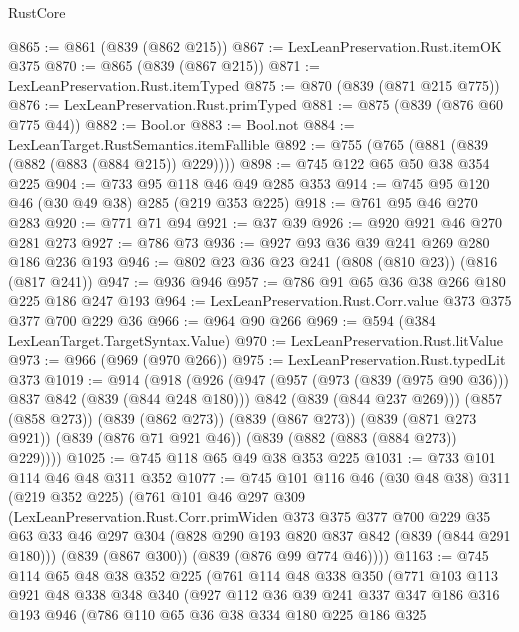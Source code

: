 \begin{lexlean}{RustCore}
\begin{coremodule}
@865 := @861 (@839 (@862 @215))
@867 := LexLeanPreservation.Rust.itemOK @375
@870 := @865 (@839 (@867 @215))
@871 := LexLeanPreservation.Rust.itemTyped
@875 := @870 (@839 (@871 @215 @775))
@876 := LexLeanPreservation.Rust.primTyped
@881 := @875 (@839 (@876 @60 @775 @44))
@882 := Bool.or
@883 := Bool.not
@884 := LexLeanTarget.RustSemantics.itemFallible
@892 := @755 (@765 (@881 (@839 (@882 (@883 (@884 @215)) @229))))
@898 := @745 @122 @65 @50 @38 @354 @225
@904 := @733 @95 @118 @46 @49 @285 @353
@914 := @745 @95 @120 @46 (@30 @49 @38) @285 (@219 @353 @225)
@918 := @761 @95 @46 @270 @283
@920 := @771 @71 @94
@921 := @37 @39
@926 := @920 @921 @46 @270 @281 @273
@927 := @786 @73
@936 := @927 @93 @36 @39 @241 @269 @280 @186 @236 @193
@946 := @802 @23 @36 @23 @241 (@808 (@810 @23)) (@816 (@817 @241))
@947 := @936 @946
@957 := @786 @91 @65 @36 @38 @266 @180 @225 @186 @247 @193
@964 := LexLeanPreservation.Rust.Corr.value @373 @375 @377 @700 @229 @36
@966 := @964 @90 @266
@969 := @594 (@384 LexLeanTarget.TargetSyntax.Value)
@970 := LexLeanPreservation.Rust.litValue
@973 := @966 (@969 (@970 @266))
@975 := LexLeanPreservation.Rust.typedLit @373
@1019 := @914
    (@918
      (@926
        (@947
          (@957 (@973 (@839 (@975 @90 @36))) @837 @842 (@839 (@844 @248 @180)))
          @842
          (@839 (@844 @237 @269)))
        (@857 (@858 @273))
        (@839 (@862 @273))
        (@839 (@867 @273))
        (@839 (@871 @273 @921))
        (@839 (@876 @71 @921 @46))
        (@839 (@882 (@883 (@884 @273)) @229))))
@1025 := @745 @118 @65 @49 @38 @353 @225
@1031 := @733 @101 @114 @46 @48 @311 @352
@1077 := @745
    @101
    @116
    @46
    (@30 @48 @38)
    @311
    (@219 @352 @225)
    (@761
      @101
      @46
      @297
      @309
      (LexLeanPreservation.Rust.Corr.primWiden
        @373
        @375
        @377
        @700
        @229
        @35
        @63
        @33
        @46
        @297
        @304
        (@828 @290 @193 @820 @837 @842 (@839 (@844 @291 @180)))
        (@839 (@867 @300))
        (@839 (@876 @99 @774 @46))))
@1163 := @745
    @114
    @65
    @48
    @38
    @352
    @225
    (@761
      @114
      @48
      @338
      @350
      (@771
        @103
        @113
        @921
        @48
        @338
        @348
        @340
        (@927
          @112
          @36
          @39
          @241
          @337
          @347
          @186
          @316
          @193
          @946
          (@786
            @110
            @65
            @36
            @38
            @334
            @180
            @225
            @186
            @325

\end{coremodule}
\end{lexlean}
